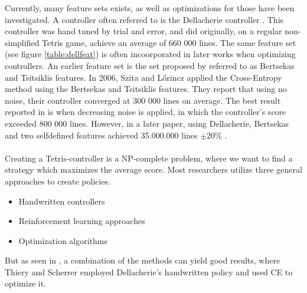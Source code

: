 Currently, many feature sets exists, as well as optimizations for those have been
investigated. A controller often referred to is the Dellacherie controller 
\citep{fahey}. This controller was hand tuned by trial and error,
and did originally, on a regular non-simplified Tetris game, achieve an average of
660 000 lines. The same feature set (see figure \ref{table:dellfeat}) is 
often incoorporated in later works when optimizing controllers. An earlier
feature set is the set proposed by \citep{Bertsekas} referred to as Bertsekas and
Tsitsiklis features. In 2006, Szita and L\H{o}rincz \citep{szita:06} applied the Cross-Entropy
method using the Bertsekas and Tsitsiklis features. They report that using no noise,
their controller converged at 300 000 lines on average. The best result reported in \citep{szita:06}
is when decreasing noise is applied, in which the controller's score exceeded 800 000 lines. However, in a later paper, using Dellacherie, Bertsekas and two selfdefined features achieved 35.000.000 lines $\pm 20\%$  \citep{scherrer2009}.\\
\\
Creating a Tetris-controller is a NP-complete problem, where we want to find a strategy which maximizes the average score. Most researchers utilize three general approaches to create policies.

\begin{itemize}
\item Handwritten controllers
\item Reinforcement learning approaches
\item Optimization algorithms
\end{itemize}

But as seen in \citep{scherrer2009}, a combination of the methods can yield good results, where Thiery and Scherrer employed Dellacherie's handwritten policy and used CE to optimize it.
